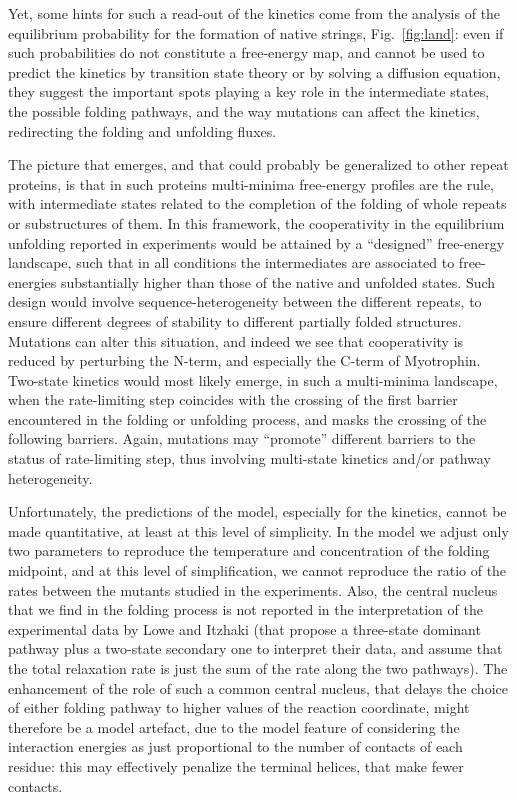 Yet, some hints for such a read-out of the kinetics come from the analysis of
the equilibrium probability for the formation of native strings,
Fig.~\ref{fig:land}: even if such probabilities do not constitute a free-energy
map, and cannot be used to predict the kinetics by transition state theory or by
solving a diffusion equation, they suggest the important spots playing a key
role in the intermediate states, the possible folding pathways, and the way
mutations can affect the kinetics, redirecting the folding and unfolding fluxes.

The picture that emerges, and that could probably be generalized to other repeat
proteins, is that in such proteins multi-minima free-energy profiles are the
rule, with intermediate states related to the completion of the folding of whole
repeats or substructures of them. In this framework, the cooperativity in the
equilibrium unfolding reported in experiments would be attained by a
``designed'' free-energy landscape, such that in all conditions the
intermediates are associated to free-energies substantially higher than those of
the native and unfolded states. Such design would involve sequence-heterogeneity
between the different repeats, to ensure different degrees of stability to
different partially folded structures. Mutations can alter this
situation\cite{Kloss2008}, and indeed we see that cooperativity is reduced by
perturbing the N-term, and especially the C-term of Myotrophin.
Two-state kinetics would most likely emerge, in such a multi-minima landscape,
when the rate-limiting step coincides with the crossing of the first barrier
encountered in the folding or unfolding process, and masks the crossing of the
following barriers. Again, mutations may ``promote'' different barriers to the
status of rate-limiting step, thus involving multi-state kinetics and/or pathway
heterogeneity.

Unfortunately, the predictions of the model, especially for the kinetics, cannot
be made quantitative, at least at this level of simplicity. In the model we
adjust only two parameters to reproduce the temperature and concentration of the
folding midpoint, and at this level of simplification, we cannot reproduce the
ratio of the rates between the mutants studied in the experiments. Also, the
central nucleus that we find in the folding process is not reported in the
interpretation of the experimental data by Lowe and Itzhaki (that propose a
three-state dominant pathway plus a two-state secondary one to interpret their
data, and assume that the total relaxation rate is just the sum of the rate
along the two pathways). The enhancement of the role of such a common
central nucleus, that delays the choice of either folding pathway to higher
values of the reaction coordinate, might therefore be a model artefact, due to
the model feature of considering the interaction energies as just proportional
to the number of contacts of each residue: this may effectively penalize the
terminal helices, that make fewer contacts.

